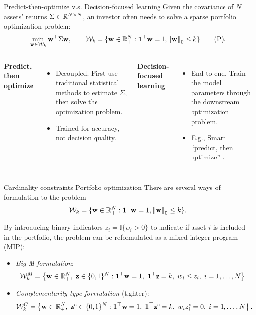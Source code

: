 \documentclass[10pt,aspectratio=169]{beamer}
\newcommand{\Kcard}{k}
\newcommand{\Wset}{\mathcal{W}}
\newcommand{\SigmaMat}{\Sigma}
\begin{document}
\begin{frame}{Predict-then-optimize v.s. Decision-focused learning}
  Given the covariance of $N$ assets' returns $\SigmaMat \in \RR^{N\times N}$, an investor often needs to solve a sparse portfolio optimization problem:
  \[ 
    \min_{\mathbf{w}\in\Wset_\Kcard} \mathbf{w}^\top \SigmaMat \mathbf{w},
    \qquad
    \Wset_\Kcard = \{\mathbf{w}\in\RR_+^N : \one^\top \mathbf{w}=1, \norm{\mathbf{w}}_0 \le k\} \tag{P}.
  \]

  \begin{columns}[T,onlytextwidth]
    \textbf{Predict, then optimize}
    \begin{itemize}
      \item Decoupled. First use traditional statistical methods to estimate $\SigmaMat$, then solve the optimization problem.
      \item Trained for accuracy, not decision quality.
    \end{itemize}

    \textbf{Decision-focused learning}
    \begin{itemize}
      \item End-to-end. Train the model parameters through the downstream optimization problem.
      \item E.g., Smart ``predict, then optimize'' \parencite{ElmachtoubGrigas2021SPO}.
    \end{itemize}
  \end{columns}

\end{frame}

\begin{frame}{Cardinality constraints Portfolio optimization}
  There are several ways of formulation to the problem
  \[
   \Wset_\Kcard = \{\mathbf{w}\in\RR_+^N : \one^\top \mathbf{w}=1, \norm{\mathbf{w}}_0 \le k\}.
   \]

By introducing binary indicators $z_i = \mathbb{I}\{w_i > 0\}$ to indicate if asset $i$ is included in the portfolio, the problem can be reformulated as a mixed-integer program (MIP):

\begin{itemize}
  \item \emph{Big-M formulation}: 
    \[
      \Wset_\Kcard^M
      =
      \left\{
        \mathbf{w}\in\RR_+^N,\; \mathbf{z}\in\{0,1\}^N :
        \one^\top \mathbf{w}=1,\;
        \one^\top \mathbf{z}=\Kcard,\;
        w_i \le z_i,\; i=1,\ldots,N
      \right\}.
    \] 
  \item \emph{Complementarity-type formulation} (tighter):
    \[
      \Wset_\Kcard^C
      =
      \left\{
        \mathbf{w}\in\RR_+^N,\; \mathbf{z}^c \in\{0,1\}^N :
        \one^\top \mathbf{w}=1,\;
        \one^\top \mathbf{z}^c=\Kcard,\;
        w_i z_i^c = 0,\; i=1,\ldots,N
      \right\}.
    \]
\end{itemize}
\end{frame}
\end{document}
